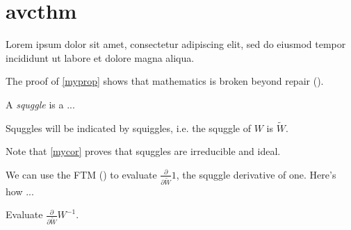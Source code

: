 \newpage
\section*{avcthm}\indent

Lorem ipsum dolor sit amet, consectetur adipiscing elit, sed do eiusmod tempor incididunt ut labore et dolore magna aliqua.
\begin{prop}
\label{myprop}
\end{prop}
The proof of \cref{myprop} shows that mathematics is broken beyond repair ().

\begin{dfn}
A \textit{squggle} is a ...
\end{dfn}

\begin{ntt}
Squggles will be indicated by squiggles, i.e. the squggle of $W$ is $\widetilde{W}$.
\end{ntt}

\begin{lem}
\end{lem}

\begin{thm}
\label{mythm}
\end{thm}

\begin{cor}
\label{mycor}
\end{cor}

\begin{rmk}
Note that \cref{mycor} proves that squggles are irreducible and ideal.
\end{rmk}

\begin{ex}
We can use the FTM () to evaluate $\displaystyle\frac{\partial}{\partial \widetilde{W}}1$, the squggle derivative of one.  Here's how ...
\end{ex}

\begin{prob}
Evaluate $\displaystyle\frac{\partial}{\partial \widetilde{W}}W^{-1}$.
\end{prob}

\begin{drv}
\end{drv}

